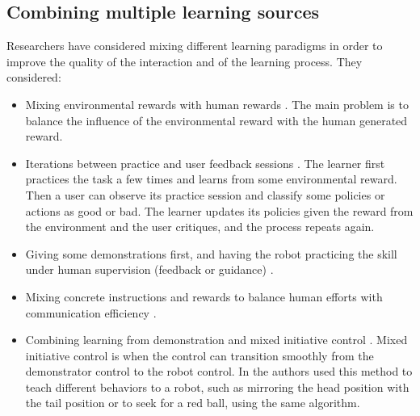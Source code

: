 \subsection{Combining multiple learning sources}

Researchers have considered mixing different learning paradigms in order to improve the quality of the interaction and of the learning process. They considered:

\begin{itemize}

\item Mixing environmental rewards with human rewards \cite{knox2010combining,griffith2013policy,grave2013learning}. The main problem is to balance the influence of the environmental reward with the human generated reward.

\item Iterations between practice and user feedback sessions \cite{judah2010reinforcement}. The learner first practices the task a few times and learns from some environmental reward. Then a user can observe its practice session and classify some policies or actions as good or bad. The learner updates its policies given the reward from the environment and the user critiques, and the process repeats again.

\item Giving some demonstrations first, and having the robot practicing the skill under human supervision (feedback or guidance) \cite{nicolescu2003natural,pardowitz2007incremental}.

\item Mixing concrete instructions and rewards to balance human efforts with communication efficiency \cite{pilarski2012between}.

\item Combining learning from demonstration and mixed initiative control \cite{grollman2007dogged}. Mixed initiative control is when the control can transition smoothly from the demonstrator control to the robot control. In \cite{grollman2007dogged} the authors used this method to teach different behaviors to a robot, such as mirroring the head position with the tail position or to seek for a red ball, using the same algorithm.


\end{itemize}
